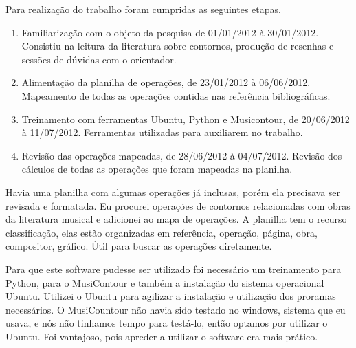 \documentclass[11pt]{article}
\begin{document}
Para realização do trabalho foram cumpridas as seguintes etapas.

\begin{enumerate}
\item Familiarização com o objeto da pesquisa de 01/01/2012 à 30/01/2012.
Consistiu na leitura da literatura sobre contornos, produção de resenhas
e sessões de dúvidas com o orientador.
\item Alimentação da planilha de operações, de 23/01/2012 à 06/06/2012.
Mapeamento de todas as operações contidas nas referência
bibliográficas.
\item Treinamento com ferramentas Ubuntu, Python e Musicontour, de 20/06/2012 à 11/07/2012.
Ferramentas utilizadas para auxiliarem no trabalho.
\item Revisão das operações mapeadas, de 28/06/2012 à 04/07/2012.
Revisão dos cálculos de todas as operações que foram mapeadas na planilha.
\end{enumerate}

Havia uma planilha com algumas operações já inclusas, porém ela
precisava ser revisada e formatada.  Eu procurei operações de
contornos relacionadas com obras da literatura musical e adicionei ao
mapa de operações. A planilha tem o recurso classificação, elas estão
organizadas em referência, operação, página, obra, compositor,
gráfico.
Útil para buscar as operações diretamente.

Para que este software pudesse ser utilizado foi necessário um
treinamento para Python, para o MusiContour e também a instalação do
sistema operacional Ubuntu. Utilizei o Ubuntu para agilizar a
instalação e utilização dos proramas necessários. O MusiCountour não
havia sido testado no windows, sistema que eu usava, e nós não
tinhamos tempo para testá-lo, então optamos por utilizar o Ubuntu. Foi
vantajoso, pois apreder a utilizar o software era mais prático.
\end{document}
